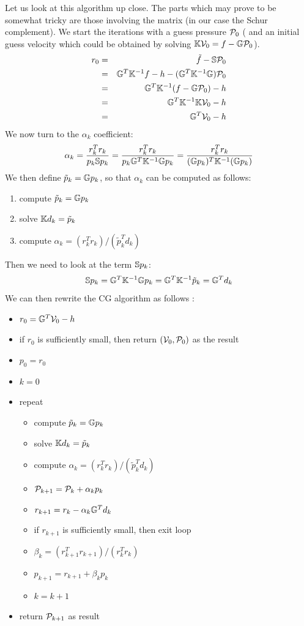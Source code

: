 Let us look at this algorithm up close. The parts which may prove to be somewhat tricky 
are those involving the matrix (in our case the Schur complement).
We start the iterations with a guess pressure ${\cal P}_0$ (
and an initial guess velocity which could be obtained by solving ${\mathbb{K}} {\cal V}_0 =f- {\mathbb{G}} {\cal P}_0$).
\begin{eqnarray}
r_0 
&=& \tilde{f}-{\mathbb{S}} {\cal P}_0 \\
&=& {\mathbb{G}}^T {\mathbb{K}}^{-1} f - h - ({\mathbb{G}}^T {\mathbb{K}}^{-1} {\mathbb{G}} ) {\cal P}_0 \\ 
&=& {\mathbb{G}}^T {\mathbb{K}}^{-1} (f - {\mathbb{G}} {\cal P}_0) - h \\
&=& {\mathbb{G}}^T {\mathbb{K}}^{-1} {\mathbb{K}} {\cal V}_0 - h \\ 
&=& {\mathbb{G}}^T {\cal V}_0 - h \\ 
\end{eqnarray}
We now turn to the $\alpha_k$ coefficient:
\[
\alpha_k 
= \frac{r_k^T r_k }{p_k {\mathbb{S}} p_k } 
= \frac{r_k^T r_k }{p_k {\mathbb{G}}^T {\mathbb{K}}^{-1} {\mathbb{G}}  p_k } 
= \frac{r_k^T r_k }{({\mathbb{G}} p_k)^T  {\mathbb{K}}^{-1} ({\mathbb{G}}  p_k) } 
\]
We then define $\tilde{p}_k = {\mathbb{G}} p_k$, so that $\alpha_k$ can be computed as follows:
\begin{enumerate}
\item compute $\tilde{p}_k = {\mathbb{G}} p_k$
\item solve ${\mathbb{K}} d_k = \tilde{p}_k$
\item compute $\alpha_k=(r_k^T r_k)/(\tilde{p}_k^T d_k)$
\end{enumerate}
Then we need to look at the term ${\mathbb{S}} p_k$:
\[
{\mathbb{S}} p_k = {\mathbb{G}}^T {\mathbb{K}}^{-1} {\mathbb{G}} p_k = {\mathbb{G}}^T {\mathbb{K}}^{-1} \tilde{p}_k = {\mathbb{G}}^T d_k
\]
We can then rewrite the CG algorithm as follows \cite{zhym07}:
\begin{itemize}
\item $r_0 = {\mathbb{G}}^T {\cal V}_0 - h$ 
\item if $r_0$ is sufficiently small, then return $({\cal V}_0,{\cal P}_0)$ as the result
\item $p_0=r_0$
\item $k=0$
\item repeat
\begin{itemize}
\item compute $\tilde{p}_k = {\mathbb{G}} p_k$
\item solve ${\mathbb{K}} d_k = \tilde{p}_k$
\item compute $\alpha_k=(r_k^T r_k)/(\tilde{p}_k^T d_k)$
\item ${\cal P}_{k+1} = {\cal P}_k+\alpha_k p_k$
\item $r_{k+1} = r_k - \alpha_k {\mathbb{G}}^T d_k $
\item if $r_{k+1}$ is sufficiently small, then exit loop
\item $\beta_k=(r_{k+1}^T r_{k+1})/(r_k^T r_k)$
\item $p_{k+1} =r_{k+1}+ \beta_k p_k$
\item $k=k+1$
\end{itemize}
\item return ${\cal P}_{k+1}$ as result
\end{itemize}
